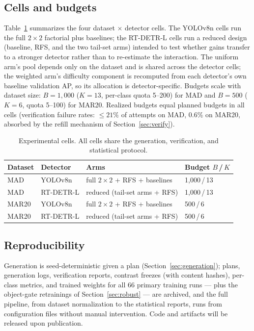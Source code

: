 \documentclass[preprint,12pt,authoryear]{elsarticle}
\begin{document}
\subsection{Cells and budgets}\label{sec:cells}

Table~\ref{tab:cells} summarizes the four dataset $\times$ detector
cells. The YOLOv8n cells run the full $2\times2$ factorial plus
baselines; the RT-DETR-L cells run a reduced design (baseline, RFS, and
the two tail-set arms) intended to test whether gains transfer to a
stronger detector rather than to re-estimate the interaction. The
uniform arm's pool depends only on the dataset and is shared across the
detector cells; the weighted arm's difficulty component is recomputed
from each detector's own baseline validation AP, so its allocation is
detector-specific. Budgets scale with dataset size: $B = 1{,}000$
($K = 13$, per-class quota 5--200) for MAD and $B = 500$ ($K = 6$, quota
5--100) for MAR20. Realized budgets equal planned budgets in all cells
(verification failure rates: $\leq 21\%$ of attempts on MAD, 0.6\% on
MAR20, absorbed by the refill mechanism of Section~\ref{sec:verify}).

\begin{table}[t]
\centering
\caption{Experimental cells. All cells share the generation,
verification, and statistical protocol.}
\label{tab:cells}
\begin{tabular}{llll}
\toprule
Dataset & Detector & Arms & Budget $B$\,/\,$K$ \\
\midrule
MAD   & YOLOv8n   & full $2\times2$ + RFS + baselines & 1{,}000\,/\,13 \\
MAD   & RT-DETR-L & reduced (tail-set arms + RFS)     & 1{,}000\,/\,13 \\
MAR20 & YOLOv8n   & full $2\times2$ + RFS + baselines & 500\,/\,6 \\
MAR20 & RT-DETR-L & reduced (tail-set arms + RFS)     & 500\,/\,6 \\
\bottomrule
\end{tabular}
\end{table}

\subsection{Reproducibility}

Generation is seed-deterministic given a plan
(Section~\ref{sec:generation}); plans, generation logs, verification
reports, contrast freezes (with content hashes), per-class metrics, and
trained weights for all 66 primary training runs --- plus the
object-gate retrainings of Section~\ref{sec:robust} --- are archived,
and the full pipeline, from dataset normalization to the statistical
reports, runs from configuration files without manual intervention.
Code and artifacts will be released upon publication.
\end{document}
